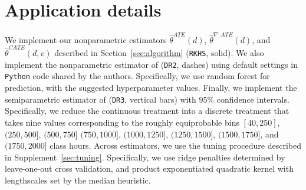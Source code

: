 \section{Application details}\label{sec:application}

We implement our nonparametric estimators $\hat{\theta}^{ATE}(d)$, $\hat{\theta}^{\nabla:ATE}(d)$, and $\hat{\theta}^{CATE}(d,v)$ described in Section~\ref{sec:algorithm} (\texttt{RKHS}, solid).  We also implement the nonparametric estimator of \cite{colangelo2020double} (\texttt{DR2}, dashes) using default settings in \texttt{Python} code shared by the authors. Specifically, we use random forest for prediction, with the suggested hyperparameter values. Finally, we implement the semiparametric estimator of \cite{singh2021debiased} (\texttt{DR3}, vertical bars) with 95\% confidence intervals. Specifically, we reduce the continuous treatment into a discrete treatment that takes nine values corresponding to the roughly equiprobable bins $[40,250]$, $(250,500]$, $(500,750]$ $(750,1000]$, $(1000,1250]$, $(1250,1500]$, $(1500,1750]$, and $(1750,2000]$ class hours. Across estimators, we use the tuning procedure described in Supplement~\ref{sec:tuning}. Specifically, we use ridge penalties determined by leave-one-out cross validation, and product exponentiated quadratic kernel with lengthscales set by the median heuristic. 


